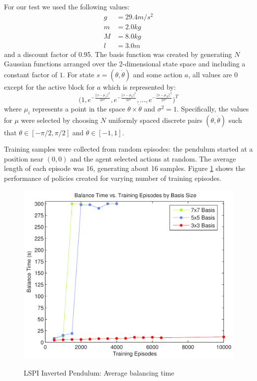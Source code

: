 For our test we used the following values:
\[
    \begin{aligned}
        g &= 29.4 m/s^2 \\
        m &= 2.0 kg \\
        M &= 8.0 kg \\
        l &= 3.0 m
    \end{aligned}
\]
and a discount factor of 0.95. The basis function was created by generating $N$ Gaussian functions arranged over the 2-dimensional state space and including a constant factor of $1$. For state $s = (\theta,\dot{\theta})$ and some action $a$, all values are $0$ except for the active block for $a$ which is represented by:
\[
    \big(1, e^{-\frac{||s - \mu_1||^2}{2\sigma^2}}, e^{-\frac{||s - \mu_2||^2}{2\sigma^2}}, \dots, e^{-\frac{||s - \mu_N||^2}{2\sigma^2}}\big)^T
\]
where $\mu_i$ represents a point in the space $\theta \times \dot{\theta}$ and $\sigma^2 = 1$. Specifically, the values for $\mu$ were selected by choosing $N$ uniformly spaced discrete pairs $(\theta, \dot{\theta})$ such that $\theta \in [-\pi/2, \pi/2]$ and $\dot{\theta} \in [-1, 1]$. 

Training samples were collected from random episodes: the pendulum started at a position near $(0,0)$ and the agent selected actions at random. The average length of each episode was 16, generating about 16 samples. Figure \ref{fig:pendulum} shows the performance of policies created for varying number of training episodes.

\begin{figure}
	\centering
		\includegraphics[width=0.33\paperheight]{Balance_vs_Samples.png}
	\label{fig:pendulum}
    \caption{LSPI Inverted Pendulum: Average balancing time}
\end{figure}

